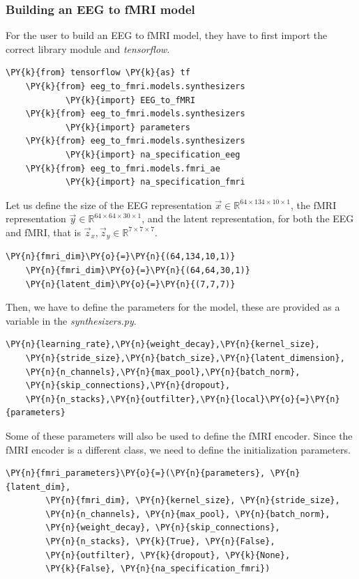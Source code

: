 \subsubsection{Building an EEG to fMRI model}\label{section:build_model}

For the user to build an EEG to fMRI model, they have to first import the correct library module and \textit{tensorflow}.
\begin{Verbatim}[commandchars=\\\{\},fontsize=\footnotesize]
    \PY{k}{from} tensorflow \PY{k}{as} tf
    \PY{k}{from} eeg_to_fmri.models.synthesizers 
            \PY{k}{import} EEG_to_fMRI
    \PY{k}{from} eeg_to_fmri.models.synthesizers 
            \PY{k}{import} parameters
    \PY{k}{from} eeg_to_fmri.models.synthesizers
            \PY{k}{import} na_specification_eeg
    \PY{k}{from} eeg_to_fmri.models.fmri_ae 
            \PY{k}{import} na_specification_fmri
\end{Verbatim}
Let us define the size of the EEG representation $\vec{x} \in \mathbb{R}^{64\times 134\times 10 \times 1}$, the fMRI representation  $\vec{y} \in \mathbb{R}^{64\times 64\times 30\times 1}$, and the latent representation, for both the EEG and fMRI, that is $\vec{z}_x,\vec{z}_y \in \mathbb{R}^{7\times 7\times 7}$.
\begin{Verbatim}[commandchars=\\\{\},fontsize=\footnotesize]
    \PY{n}{fmri_dim}\PY{o}{=}\PY{n}{(64,134,10,1)}
    \PY{n}{fmri_dim}\PY{o}{=}\PY{n}{(64,64,30,1)}
    \PY{n}{latent_dim}\PY{o}{=}\PY{n}{(7,7,7)}
\end{Verbatim}
Then, we have to define the parameters for the model, these are provided as a variable in the \textit{synthesizers.py}.
\begin{Verbatim}[commandchars=\\\{\},fontsize=\footnotesize]
    \PY{n}{learning_rate},\PY{n}{weight_decay},\PY{n}{kernel_size},
    \PY{n}{stride_size},\PY{n}{batch_size},\PY{n}{latent_dimension},
    \PY{n}{n_channels},\PY{n}{max_pool},\PY{n}{batch_norm},
    \PY{n}{skip_connections},\PY{n}{dropout},
    \PY{n}{n_stacks},\PY{n}{outfilter},\PY{n}{local}\PY{o}{=}\PY{n}{parameters}
\end{Verbatim}
Some of these parameters will also be used to define the fMRI encoder. Since the fMRI encoder is a different class, we need to define the initialization parameters.
\begin{Verbatim}[commandchars=\\\{\},fontsize=\footnotesize]
    \PY{n}{fmri_parameters}\PY{o}{=}(\PY{n}{parameters}, \PY{n}{latent_dim}, 
        \PY{n}{fmri_dim}, \PY{n}{kernel_size}, \PY{n}{stride_size}, 
        \PY{n}{n_channels}, \PY{n}{max_pool}, \PY{n}{batch_norm}, 
        \PY{n}{weight_decay}, \PY{n}{skip_connections}, 
        \PY{n}{n_stacks}, \PY{k}{True}, \PY{n}{False}, 
        \PY{n}{outfilter}, \PY{k}{dropout}, \PY{k}{None}, 
        \PY{k}{False}, \PY{n}{na_specification_fmri})
\end{Verbatim}
